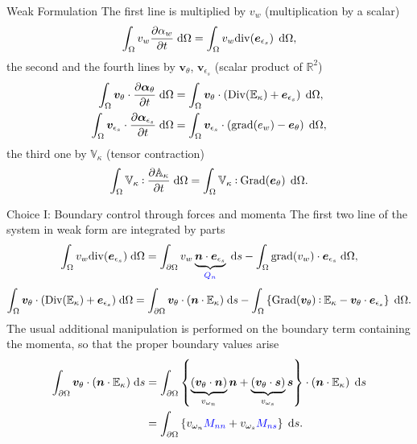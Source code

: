 \documentclass{beamer}
\def\onedot{$\mathsurround0pt\ldotp$}
\def\cddot{%
	\mathbin{\vcenter{\baselineskip.67ex
			\hbox{\onedot}\hbox{\onedot}}%
}}
\newcommand{\blue}[1]{\textcolor{blue}{#1}}
\begin{document}
\begin{frame}{Weak Formulation}
	The first line is multiplied  by $v_w$ (multiplication by a scalar) 
	\[\int_{\Omega} v_w \diffp{\alpha_w}{t}  \d\Omega =  \int_{\Omega} v_w \mathrm{div}(\bm{e}_{\epsilon_s}) \, \d\Omega,
	\]
	the second and the fourth lines by $\bm{v}_{\theta}$, $\bm{v}_{\epsilon_s}$ (scalar product of $\mathbb{R}^2$) 
	\begin{align*}
	\int_{\Omega} \bm{v}_{\theta} \cdot \diffp{\bm\alpha_{\theta}}{t}   \d\Omega &= \int_{\Omega} \bm{v}_{\theta} \cdot (\mathrm{Div}( \mathbb{E}_{\kappa}) + \bm{e}_{\epsilon_s}) \,  \d\Omega, \\
	\int_{\Omega} \bm{v}_{\epsilon_s} \cdot \diffp{\bm\alpha_{\epsilon_s}}{t}   \d\Omega &= \int_{\Omega} \bm{v}_{\epsilon_s} \cdot (\mathrm{grad}({e}_{w}) - \bm{e}_{\theta}) \, \d\Omega, 
	\end{align*}
	the third one by $\mathbb{V}_{\kappa}$ (tensor contraction)
	\[\int_{\Omega} \mathbb{V}_{\kappa} \cddot \diffp{\mathbb{A}_{\kappa}}{t}   \d\Omega = \int_{\Omega} \mathbb{V}_{\kappa} \cddot \mathrm{Grad}(\bm{e}_\theta) \, \d\Omega.
	\]
\end{frame}	

\begin{frame}{Choice I: Boundary control through forces and momenta}
The first two line of the system in weak form are integrated by parts
	\begin{equation*}
	\int_{\Omega} v_w \mathrm{div}(\bm{e}_{\epsilon_s})  \d\Omega = \int_{\partial \Omega} v_w \underbrace{\bm{n} \cdot \bm{e}_{\epsilon_s}}_{\blue{Q_n}}  \d s - \int_{\Omega} \mathrm{grad}(v_w)  \cdot \bm{e}_{\epsilon_s}  \d\Omega,
	\end{equation*}
	\small{
	\begin{equation*}
	\int_{\Omega} \bm{v}_{\theta} \cdot (\mathrm{Div}(\mathbb{E}_{\kappa}) + \bm{e}_{\epsilon_s})  \d\Omega = \int_{\partial \Omega} \bm{v}_{\theta} \cdot (\bm{n} \cdot \mathbb{E}_{\kappa})  \d s -\int_{\Omega} \left\{ \mathrm{Grad}(\bm{v}_{\theta}) \cddot \mathbb{E}_{\kappa} - \bm{v}_{\theta} \cdot \bm{e}_{\epsilon_s}\right\}  \d\Omega.
	\end{equation*}
	}
	\normalsize
	The usual additional manipulation is performed on the boundary term containing the momenta, so that the proper boundary values arise
	\begin{equation*}
	\begin{aligned}
	\int_{\partial \Omega} \bm{v}_{\theta} \cdot (\bm{n} \cdot \mathbb{E}_{\kappa})  \d s &= \int_{\partial \Omega} \left\{\underbrace{(\bm{v}_{\theta} \cdot \bm{n})}_{v_{\omega_n}} \bm{n} + \underbrace{(\bm{v}_{\theta} \cdot \bm{s})}_{v_{\omega_s}} \bm{s} \right\} \cdot (\bm{n} \cdot \mathbb{E}_{\kappa}) \,  \d s \\
	&= \int_{\partial \Omega} \left\{ v_{\omega_n} \blue{M_{nn}} + v_{\omega_s} \blue{M_{ns}} \right\}  \d s.
	\end{aligned}
	\end{equation*}

\end{frame}
\end{document}
